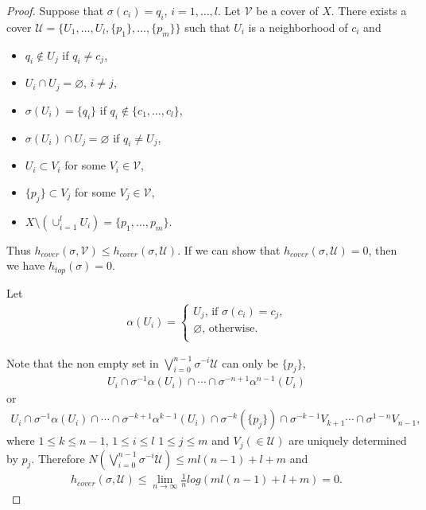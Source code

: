 \documentclass[a4paper,10pt]{amsart}
\newcommand{\UUU}{\mathcal U}
\begin{document}
\begin{proof}
    Suppose that $\sigma(c_i) = q_i$, $i = 1, \ldots, l$.     
    Let $\mathcal{V}$ be a cover of $X$. There exists a cover 
    $\UUU = \{U_1, \ldots, U_{l}, \{p_1\}, \ldots, \{p_m\}\}$ such that
    $U_i$ is a neighborhood of $c_i$ and
    \begin{itemize} 
        \item $q_i \notin U_j$ if $q_i \neq c_j$,
        \item $U_{i} \cap U_{j} = \varnothing$, $i \neq j$,
        \item $\sigma(U_i) = \{q_i\}$ if $q_i \notin \{c_1, \ldots, c_l\}$,
        \item $\sigma(U_{i}) \cap U_j = \varnothing$ if 
            $q_i \neq U_j$,
        \item $U_{i} \subset V_{i}$ for some $V_i \in \mathcal{V}$,
        \item $\{p_j\} \subset V_{j}$ for some $V_j \in \mathcal{V}$,
        \item $X \setminus (\cup^{l}_{i = 1}U_{i}) = 
            \{p_1, \ldots, p_m \}$. 
    \end{itemize}
Thus
$h_{cover}(\sigma, \mathcal{V}) \leq h_{cover}(\sigma, \UUU)$.
If we can show that $h_{cover}(\sigma, \UUU) = 0$, then we
    have $h_{top}(\sigma) = 0$.

Let  
\begin{align*}
    \alpha(U_i) = \begin{cases}
        U_j  \mbox{, if $\sigma(c_i) = c_j$,}\\
    \varnothing  \mbox{, otherwise.}\\
  \end{cases} 
\end{align*}

Note that the non empty set in $\bigvee^{n-1}_{i = 0}\sigma^{-i}\UUU$ 
can only be $\{p_j\}$, 
\begin{align*}
 U_{i} \cap \sigma^{-1}\alpha(U_{i}) \cap \cdots \cap
\sigma^{-n+1}\alpha^{n-1}(U_{i})
\end{align*}
or
\begin{align*}
 U_{i} \cap \sigma^{-1}\alpha(U_{i}) \cap \cdots \cap
\sigma^{-k+1}\alpha^{k-1}(U_{i}) \cap \sigma^{-k}(\{p_j\})    
\cap \sigma^{-k-1}V_{k+1} \cdots \cap \sigma^{1-n}V_{n-1},
\end{align*}
where $ 1 \leq k \leq n-1$, $1 \leq i \leq l$
$1 \leq j \leq m$ and $V_j (\in \UUU)$ are uniquely determined by $p_j$.
Therefore 
$N(\bigvee^{n-1}_{i = 0}\sigma^{-i}\UUU) \leq ml(n-1)+l+m$ and
\begin{align*}
        h_{cover}(\sigma, \UUU) \leq \lim_{n \rightarrow \infty}
        \frac{1}{n}log(ml(n-1)+l+m) = 0.
\end{align*}
\end{proof}
\end{document}
